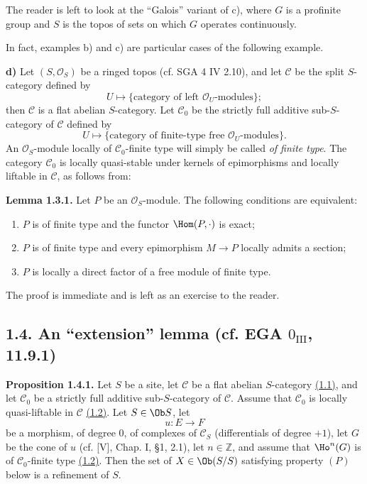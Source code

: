 The reader is left to look at the ``Galois'' variant of c), where \(G\) is a profinite group and \(S\) is the topos of sets on which \(G\) operates continuously.

In fact, examples b) and c) are particular cases of the following example.

\textbf{d)} Let \((S,\mathcal O_S)\) be a ringed topos (cf. SGA 4 IV 2.10), and let \(\mathcal C\) be the split \(S\)-category defined by
\[
  U\longmapsto \{\text{category of left }\mathcal O_U\text{-modules}\};
\]
then \(\mathcal C\) is a flat abelian \(S\)-category. Let \(\mathcal C_0\) be the strictly full additive sub-\(S\)-category of \(\mathcal C\) defined by
\[
  U\longmapsto \{\text{category of finite-type free }\mathcal O_U\text{-modules}\}.
\]
An \(\mathcal O_S\)-module locally of \(\mathcal C_0\)-finite type will simply be called \emph{of finite type}. The category \(\mathcal C_0\) is locally quasi-stable under kernels of epimorphisms and locally liftable in \(\mathcal C\), as follows from:

\textbf{Lemma 1.3.1.} Let \(P\) be an \(\mathcal O_S\)-module. The following conditions are equivalent:
\begin{enumerate}[label=(\roman*)]
\item \(P\) is of finite type and the functor \(\Hom(P,\cdot)\) is exact;
\item \(P\) is of finite type and every epimorphism \(M\to P\) locally admits a section;
\item \(P\) is locally a direct factor of a free module of finite type.
\end{enumerate}
The proof is immediate and is left as an exercise to the reader.

\subsection*{1.4. An ``extension'' lemma (cf. EGA \(0_{\mathrm{III}}\), 11.9.1)}

\textbf{Proposition 1.4.1.} Let \(S\) be a site, let \(\mathcal C\) be a flat abelian \(S\)-category \hyperlink{sga6.e01.sec.1.1}{(1.1)}, and let \(\mathcal C_0\) be a strictly full additive sub-\(S\)-category of \(\mathcal C\). Assume that \(\mathcal C_0\) is locally quasi-liftable in \(\mathcal C\) \hyperlink{sga6.e01.sec.1.2}{(1.2)}. Let \(S\in\Ob S\), let
\[
  u:E\longrightarrow F
\]
be a morphism, of degree \(0\), of complexes of \(\mathcal C_S\) (differentials of degree \(+1\)), let \(G\) be the cone of \(u\) (cf. [V], Chap. I, §1, 2.1), let \(n\in\mathbb Z\), and assume that \(\Ho^n(G)\) is of \(\mathcal C_0\)-finite type \hyperlink{sga6.e01.sec.1.2}{(1.2)}. Then the set of \(X\in\Ob(S/S)\) satisfying property \((P)\) below is a refinement of \(S\).

